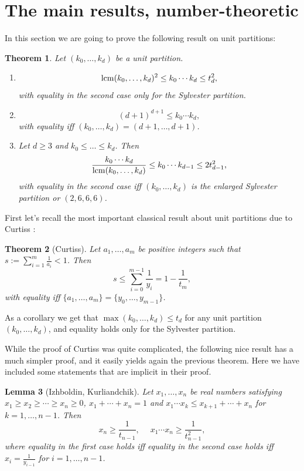 \documentclass[a4paper,twoside]{article}
\def\lcm{{\rm lcm}}
\newtheorem{theorem}{Theorem}[section]
\newtheorem{lemma}[theorem]{Lemma}
\begin{document}
\section{The main results, number-theoretic}

In this section we are going to prove the following result on unit partitions:

\begin{theorem}
Let $(k_0, \ldots, k_d)$ be a unit partition.
\begin{enumerate}
\item \[\lcm(k_0, \ldots, k_d)^2 \leq k_0 \cdots k_d \leq t_d^2,\]
with equality in the second case only for the Sylvester partition.

\item \[(d+1)^{d+1} \leq k_0 \cdots k_d,\]
with equality iff $(k_0, \ldots, k_d) = (d+1, \ldots, d+1)$.

\item Let $d \geq 3$ and $k_0 \leq \ldots \leq k_d$. Then
\[\frac{k_0 \cdots k_d}{\lcm(k_0, \ldots, k_d)} \leq k_0 \cdots k_{d-1} \leq 2 t_{d-1}^2,\] 
with equality in the second case iff $(k_0, \ldots, k_d)$ is the enlarged Sylvester partition or $(2,6,6,6)$. 
\end{enumerate}
\label{kprop}
\end{theorem}

First let's recall the most important classical result about unit partitions due to Curtiss \cite[Thm. I]{Cur22}:

\begin{theorem}[Curtiss]
Let $a_1, \ldots, a_m$ be positive integers such that $s := \sum_{i=1}^m \frac{1}{a_i}< 1$. Then
\[s \leq \sum_{i=0}^{m-1} \frac{1}{y_i} = 1 - \frac{1}{t_m},\]
with equality iff $\{a_1, \ldots, a_m\} = \{y_0, \ldots, y_{m-1}\}$.
\label{erdoes}
\end{theorem}

As a corollary we get that $\max(k_0, \ldots, k_d) \leq t_d$ for any unit partition $(k_0, \ldots, k_d)$, and 
equality holds only for the Sylvester partition. 

While the proof of Curtiss was quite complicated, the following nice result \cite[Lemma 1]{IK95} has a 
much simpler proof, and it easily yields again the previous theorem. 
Here we have included some statements that are implicit in their proof. 

\begin{lemma}[Izhboldin, Kurliandchik]
Let $x_1, \ldots, x_n$ be real numbers satisfying $x_1 \geq x_2 \geq \cdots \geq x_n \geq 0$, 
$x_1 + \cdots + x_n = 1$ and $x_1 \cdots x_k \leq x_{k+1} + \cdots + x_n$ for $k = 1, \ldots, n-1$. Then
\[x_n \geq \frac{1}{t_{n-1}},\; \quad x_1 \cdots x_n \geq \frac{1}{t_{n-1}^2},\]
where equality in the first case holds iff equality in the second case holds 
iff $x_i = \frac{1}{y_{i-1}}$ for $i = 1, \ldots, n-1$.
\label{russen}
\end{lemma}
\end{document}
